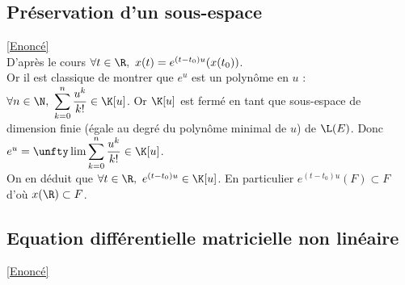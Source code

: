 \documentclass{book}
\begin{document}
	\subsection{Préservation d'un sous-espace }
	\label{Préservation d'un sous-espace corrigé}
	\textcolor{blue}{\hyperref[Préservation d'un sous-espace]{[Enoncé]}}\\
	D'après le cours $\forall t\in \R,\ x(t)=e^{(t-t_0)u}(x(t_0))$.\\
	Or il est classique de montrer que $e^u$ est un polynôme en $u$ :\\
	$\forall n\in \N,\ \displaystyle\sum_{k=0}^n\frac{u^k}{k!}\in \K[u]$. Or $\K[u]$ est fermé en tant que sous-espace de dimension finie (égale au degré du polynôme minimal de $u$) de $\L(E)$. Donc $e^u=\unfty\lim\displaystyle\sum_{k=0}^n\frac{u^k}{k!}\in \K[u]$.\\
	On en déduit que $\forall t\in \R,\ e^{(t-t_0)u}\in \K[u]$. En particulier $e^{(t-t_0)u}(F)\subset F$ d'où $x(\R)\subset F$.
	
	\subsection{Equation différentielle matricielle non linéaire}
	\label{sec:equation-differentielle-matricielle-non-lineaire}
	\textcolor{blue}{\hyperref[Equation différentielle matricielle non linéaire]{[Enoncé]}}\\
	
\end{document}
